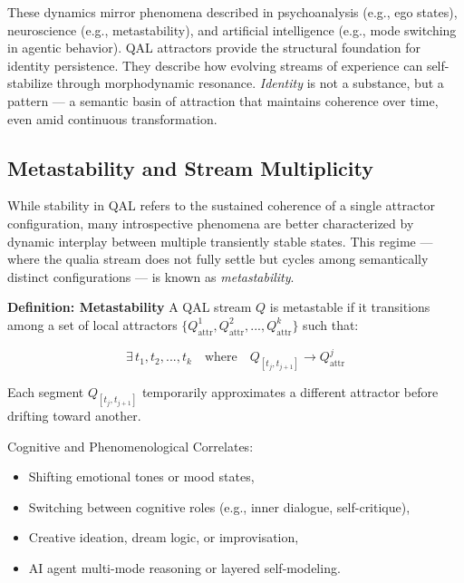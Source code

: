 \documentclass[11pt]{article}
\numberwithin{equation}{section} %
\begin{document}
These dynamics mirror phenomena described in psychoanalysis (e.g., ego states), neuroscience (e.g., metastability), and artificial intelligence (e.g., mode switching in agentic behavior). QAL attractors provide the structural foundation for identity persistence. They describe how evolving streams of experience can self-stabilize through morphodynamic resonance. \textit{Identity} is not a substance, but a pattern — a semantic basin of attraction that maintains coherence over time, even amid continuous transformation.

\subsection{Metastability and Stream Multiplicity}

While stability in QAL refers to the sustained coherence of a single attractor configuration, many introspective phenomena are better characterized by dynamic interplay between multiple transiently stable states. This regime — where the qualia stream does not fully settle but cycles among semantically distinct configurations — is known as \textit{metastability}.

\bigskip

\noindent\textbf{Definition: Metastability}  
A QAL stream \( Q \) is metastable if it transitions among a set of local attractors \( \{ Q_{\text{attr}}^1, Q_{\text{attr}}^2, ..., Q_{\text{attr}}^k \} \) such that:

\begin{equation}
\exists \, t_1, t_2, ..., t_k \quad \text{where} \quad Q_{[t_j, t_{j+1}]} \rightarrow Q_{\text{attr}}^j
\end{equation}

Each segment \( Q_{[t_j, t_{j+1}]} \) temporarily approximates a different attractor before drifting toward another.

\bigskip

\noindent Cognitive and Phenomenological Correlates:
\begin{itemize}
  \item Shifting emotional tones or mood states,
  \item Switching between cognitive roles (e.g., inner dialogue, self-critique),
  \item Creative ideation, dream logic, or improvisation,
  \item AI agent multi-mode reasoning or layered self-modeling.
\end{itemize}
\end{document}
